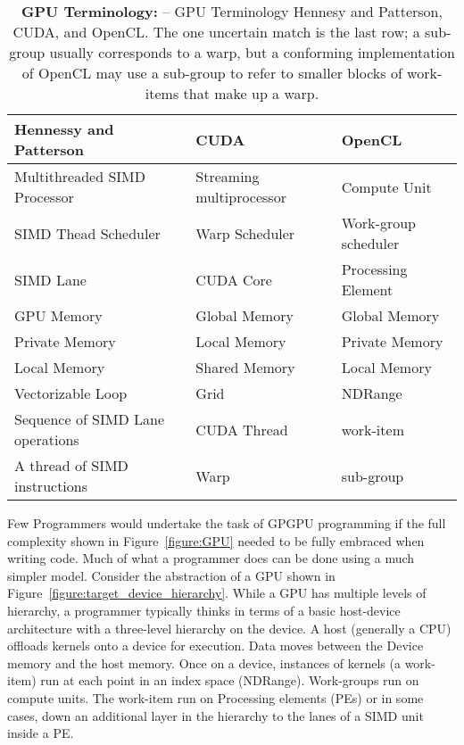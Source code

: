 \begin{table}[!htbp]
\centering
\caption{\textbf{GPU Terminology: } 
-- \small
GPU Terminology Hennesy and Patterson, CUDA, and 
OpenCL.   The one uncertain match is the last row;
a sub-group usually corresponds to a warp, but a conforming implementation of OpenCL 
may use a sub-group to refer to smaller blocks of work-items that make up a warp.}
\label{table:GPUjargon}
\begin{tabular}{|l|l|l|}
\hline
\textbf{Hennessy and Patterson}  & \textbf{CUDA} & \textbf{OpenCL} \\
\hline
Multithreaded SIMD Processor    & Streaming multiprocessor & Compute Unit \\
\hline
SIMD Thead Scheduler               & Warp Scheduler                 & Work-group scheduler \\
\hline
SIMD Lane                                  & CUDA Core                        & Processing Element \\
\hline
GPU Memory                              & Global Memory                   & Global Memory \\
\hline
Private Memory                          & Local Memory                     & Private Memory \\
\hline
Local Memory                            & Shared Memory                   & Local Memory \\
\hline
Vectorizable Loop                       & Grid                                     & NDRange \\
\hline
Sequence of SIMD Lane operations & CUDA Thread                & work-item \\
\hline
A thread of SIMD instructions            & Warp                              & sub-group \\
\hline
\end{tabular}
\end{table}

Few Programmers would undertake the task of GPGPU programming if the full complexity shown in Figure~\ref{figure:GPU}
needed to be fully embraced when writing code.  Much of what a programmer does can be done using a much 
simpler model.  Consider the abstraction of a GPU shown in Figure~\ref{figure:target_device_hierarchy}.
While a GPU has multiple levels of hierarchy, a programmer typically thinks in terms of a basic host-device
architecture with a three-level hierarchy on the device.  A host (generally a CPU) offloads kernels onto a device
for execution.   Data moves between the Device memory and the host memory.   Once on a device, instances 
of kernels (a work-item) run at each point in an index space (NDRange).  Work-groups run on compute units.
The work-item run on Processing elements (PEs) or in some cases, down an additional layer in the hierarchy to 
the lanes of a SIMD unit inside a PE.

